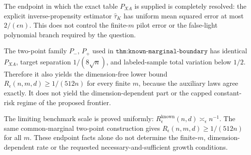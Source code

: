 The endpoint in which the exact table \(P_{XA}\) is supplied is completely resolved: the explicit inverse-propensity estimator \(\widehat\tau_K\) has uniform mean squared error at most \(2/(\epsilon n)\).  This does not control the finite-\(m\) pilot error or the false-light polynomial branch required by the question.

The two-point family \(P_-\), \(P_+\) used in \(\texttt{thm:known-marginal-boundary}\) has identical \(P_{XA}\), target separation \(1/(8\sqrt n)\), and labeled-sample total variation below \(1/2\).  Therefore it also yields the dimension-free lower bound \(R_\epsilon(n,m,d)\geq1/(512n)\) for every finite \(m\), because the auxiliary laws agree exactly.  It does not yield the dimension-dependent part or the capped constant-risk regime of the proposed frontier.

The limiting benchmark scale is proved uniformly: \(R_\epsilon^{\mathrm{known}}(n,d)\asymp_\epsilon n^{-1}\).  The same common-marginal two-point construction gives \(R_\epsilon(n,m,d)\geq1/(512n)\) for all \(m\).  These endpoint facts alone do not determine the finite-\(m\), dimension-dependent rate or the requested necessary-and-sufficient growth conditions.
